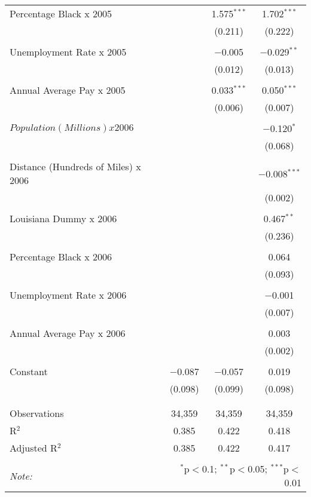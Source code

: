 \documentclass[]{article}
\begin{document}
\begin{table}[!htbp]
\begin{tabular}{@{\extracolsep{5pt}}lccc}
 Percentage Black x 2005 &  & 1.575$^{***}$ & 1.702$^{***}$ \\ 
  &  & (0.211) & (0.222) \\ 
  & & & \\ 
 Unemployment Rate x 2005 &  & $-$0.005 & $-$0.029$^{**}$ \\ 
  &  & (0.012) & (0.013) \\ 
  & & & \\ 
 Annual Average Pay x 2005 &  & 0.033$^{***}$ & 0.050$^{***}$ \\ 
  &  & (0.006) & (0.007) \\ 
  & & & \\ 
 $Population (Millions) x 2006$ &  &  & $-$0.120$^{*}$ \\ 
  &  &  & (0.068) \\ 
  & & & \\ 
 Distance (Hundreds of Miles) x 2006 &  &  & $-$0.008$^{***}$ \\ 
  &  &  & (0.002) \\ 
  & & & \\ 
 Louisiana Dummy x 2006 &  &  & 0.467$^{**}$ \\ 
  &  &  & (0.236) \\ 
  & & & \\ 
 Percentage Black x 2006 &  &  & 0.064 \\ 
  &  &  & (0.093) \\ 
  & & & \\ 
 Unemployment Rate x 2006 &  &  & $-$0.001 \\ 
  &  &  & (0.007) \\ 
  & & & \\ 
 Annual Average Pay x 2006 &  &  & 0.003 \\ 
  &  &  & (0.002) \\ 
  & & & \\ 
 Constant & $-$0.087 & $-$0.057 & 0.019 \\ 
  & (0.098) & (0.099) & (0.098) \\ 
  & & & \\ 
\hline \\[-1.8ex] 
Observations & 34,359 & 34,359 & 34,359 \\ 
R$^{2}$ & 0.385 & 0.422 & 0.418 \\ 
Adjusted R$^{2}$ & 0.385 & 0.422 & 0.417 \\ 
\hline 
\hline \\[-1.8ex] 
\textit{Note:}  & \multicolumn{3}{r}{$^{*}$p$<$0.1; $^{**}$p$<$0.05; $^{***}$p$<$0.01} \\ 
\end{tabular} 
\end{table}
\end{document}
